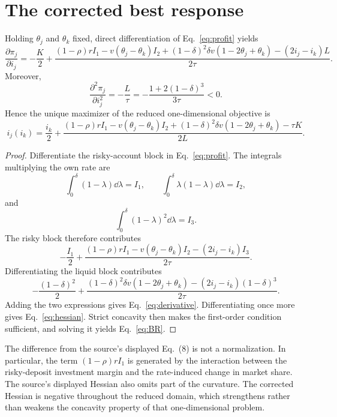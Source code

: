 \section{The corrected best response}
\begin{proposition}\label{prop:br}
Holding $\theta_j$ and $\theta_k$ fixed, direct differentiation of Eq.~\eqref{eq:profit} yields
\begin{equation}\label{eq:derivative}
\frac{\partial\pi_j}{\partial i_j}
=-\frac K2+
\frac{(1-\rho)r I_1-v(\theta_j-\theta_k)I_2
 +(1-\delta)^2\delta v(1-2\theta_j+\theta_k)
 -(2i_j-i_k)L}{2\tau}.
\end{equation}
Moreover,
\begin{equation}\label{eq:hessian}
\frac{\partial^2\pi_j}{\partial i_j^2}=-\frac{L}{\tau}
=-\frac{1+2(1-\delta)^3}{3\tau}<0.
\end{equation}
Hence the unique maximizer of the reduced one-dimensional objective is
\begin{equation}\label{eq:BR}
\boxed{
 i_j(i_k)=\frac{i_k}{2}+
\frac{(1-\rho)r I_1-v(\theta_j-\theta_k)I_2
 +(1-\delta)^2\delta v(1-2\theta_j+\theta_k)-\tau K}{2L}.}
\end{equation}
\end{proposition}

\begin{proof}
Differentiate the risky-account block in Eq.~\eqref{eq:profit}. The integrals multiplying the own rate are
\[
\int_0^\delta(1-\lambda)\dd\lambda=I_1,\qquad
\int_0^\delta\lambda(1-\lambda)\dd\lambda=I_2,
\]
and
\[
\int_0^\delta(1-\lambda)^2\dd\lambda=I_3.
\]
The risky block therefore contributes
\[
-\frac{I_1}{2}+
\frac{(1-\rho)rI_1-v(\theta_j-\theta_k)I_2-(2i_j-i_k)I_3}{2\tau}.
\]
Differentiating the liquid block contributes
\[
-\frac{(1-\delta)^2}{2}+
\frac{(1-\delta)^2\delta v(1-2\theta_j+\theta_k)
 -(2i_j-i_k)(1-\delta)^3}{2\tau}.
\]
Adding the two expressions gives Eq.~\eqref{eq:derivative}. Differentiating once more gives Eq.~\eqref{eq:hessian}. Strict concavity then makes the first-order condition sufficient, and solving it yields Eq.~\eqref{eq:BR}.
\end{proof}

The difference from the source's displayed Eq.~(8) is not a normalization. In particular, the term $(1-\rho)r I_1$ is generated by the interaction between the risky-deposit investment margin and the rate-induced change in market share. The source's displayed Hessian also omits part of the curvature. The corrected Hessian is negative throughout the reduced domain, which strengthens rather than weakens the concavity property of that one-dimensional problem.

